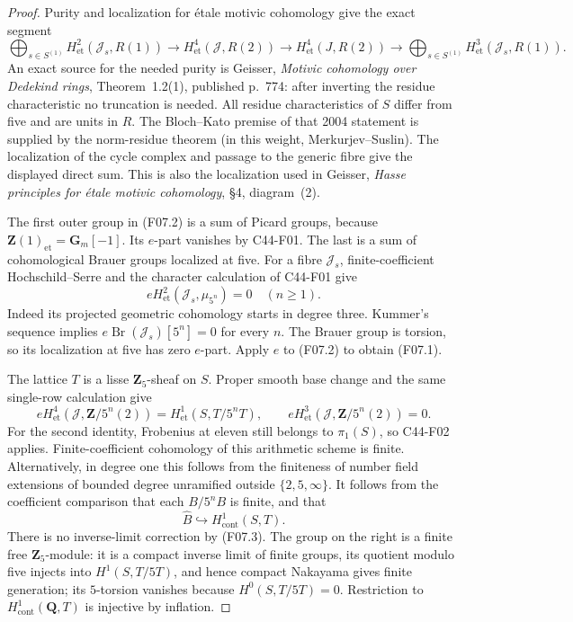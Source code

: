 \begin{proof}
Purity and localization for \'etale motivic cohomology
give the exact segment
\[
 \bigoplus_{s\in S^{(1)}}
 H^2_{\mathrm{et}}(\mathcal J_s,R(1))
 \longrightarrow H^4_{\mathrm{et}}(\mathcal J,R(2))
 \longrightarrow H^4_{\mathrm{et}}(J,R(2))
 \longrightarrow\bigoplus_{s\in S^{(1)}}
 H^3_{\mathrm{et}}(\mathcal J_s,R(1)).
                                                        \tag{F07.2}
\]
An exact source for the needed purity is Geisser,
\emph{Motivic cohomology over Dedekind rings},
Theorem~1.2(1), published p.~774: after inverting the residue
characteristic no truncation is needed.  All residue
characteristics of $S$ differ from five and are units in $R$.
The Bloch--Kato premise of that 2004 statement is supplied by
the norm-residue theorem (in this weight, Merkurjev--Suslin).
The localization of the cycle complex and passage to the
generic fibre give the displayed direct sum.  This is also
the localization used in Geisser, \emph{Hasse principles for
\'etale motivic cohomology}, \S4, diagram~(2).

The first outer group in (F07.2) is a sum of Picard groups,
because $\mathbf Z(1)_{\mathrm{et}}=\mathbf G_m[-1]$.
Its $e$-part vanishes by C44-F01.  The last is a sum of
cohomological Brauer groups localized at five.  For a fibre
$\mathcal J_s$, finite-coefficient Hochschild--Serre and the
character calculation of C44-F01 give
\[
           eH^2_{\mathrm{et}}(\mathcal J_s,\mu_{5^n})=0
           \quad(n\ge1).
\]
Indeed its projected geometric cohomology starts in degree
three.  Kummer's sequence implies
$e\operatorname{Br}(\mathcal J_s)[5^n]=0$ for every $n$.
The Brauer group is torsion, so its localization at five has
zero $e$-part.  Apply $e$ to (F07.2) to obtain (F07.1).

The lattice $T$ is a lisse $\mathbf Z_5$-sheaf on $S$.
Proper smooth base change and the same single-row calculation
give
\[
 eH^4_{\mathrm{et}}(\mathcal J,\mathbf Z/5^n(2))
          =H^1_{\mathrm{et}}(S,T/5^nT),
 \qquad eH^3_{\mathrm{et}}(\mathcal J,\mathbf Z/5^n(2))=0.
                                                        \tag{F07.3}
\]
For the second identity, Frobenius at eleven still belongs
to $\pi_1(S)$, so C44-F02 applies.  Finite-coefficient
cohomology of this arithmetic scheme is finite.  Alternatively,
in degree one this follows from the finiteness of number
field extensions of bounded degree unramified outside
$\{2,5,\infty\}$.
It follows from the coefficient comparison that each
$B/5^nB$ is finite, and that
\[
 \widehat B\hookrightarrow
           H^1_{\mathrm{cont}}(S,T).
                                                        \tag{F07.4}
\]
There is no inverse-limit correction by (F07.3).
The group on the right is a finite free $\mathbf Z_5$-module:
it is a compact inverse limit of finite groups, its quotient
modulo five injects into $H^1(S,T/5T)$, and hence compact
Nakayama gives finite generation; its $5$-torsion vanishes
because $H^0(S,T/5T)=0$.  Restriction to
$H^1_{\mathrm{cont}}(\mathbf Q,T)$ is injective by inflation.


\end{proof}
